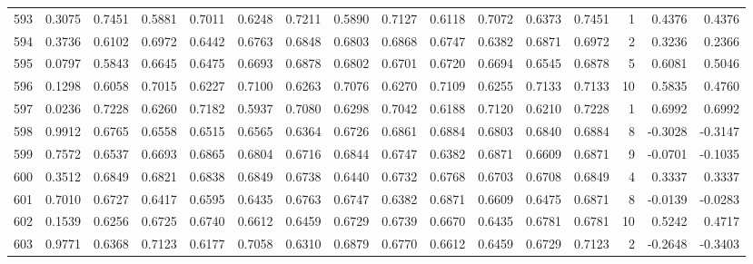 \begin{tabular}{lrrrrrrrrrrrrrrr}
593 &      0.3075 &  0.7451 &  0.5881 &  0.7011 &  0.6248 &  0.7211 &  0.5890 &  0.7127 &  0.6118 &  0.7072 &   0.6373 &     0.7451 &      1 &                    0.4376 &                     0.4376 \\
594 &      0.3736 &  0.6102 &  0.6972 &  0.6442 &  0.6763 &  0.6848 &  0.6803 &  0.6868 &  0.6747 &  0.6382 &   0.6871 &     0.6972 &      2 &                    0.3236 &                     0.2366 \\
595 &      0.0797 &  0.5843 &  0.6645 &  0.6475 &  0.6693 &  0.6878 &  0.6802 &  0.6701 &  0.6720 &  0.6694 &   0.6545 &     0.6878 &      5 &                    0.6081 &                     0.5046 \\
596 &      0.1298 &  0.6058 &  0.7015 &  0.6227 &  0.7100 &  0.6263 &  0.7076 &  0.6270 &  0.7109 &  0.6255 &   0.7133 &     0.7133 &     10 &                    0.5835 &                     0.4760 \\
597 &      0.0236 &  0.7228 &  0.6260 &  0.7182 &  0.5937 &  0.7080 &  0.6298 &  0.7042 &  0.6188 &  0.7120 &   0.6210 &     0.7228 &      1 &                    0.6992 &                     0.6992 \\
598 &      0.9912 &  0.6765 &  0.6558 &  0.6515 &  0.6565 &  0.6364 &  0.6726 &  0.6861 &  0.6884 &  0.6803 &   0.6840 &     0.6884 &      8 &                   -0.3028 &                    -0.3147 \\
599 &      0.7572 &  0.6537 &  0.6693 &  0.6865 &  0.6804 &  0.6716 &  0.6844 &  0.6747 &  0.6382 &  0.6871 &   0.6609 &     0.6871 &      9 &                   -0.0701 &                    -0.1035 \\
600 &      0.3512 &  0.6849 &  0.6821 &  0.6838 &  0.6849 &  0.6738 &  0.6440 &  0.6732 &  0.6768 &  0.6703 &   0.6708 &     0.6849 &      4 &                    0.3337 &                     0.3337 \\
601 &      0.7010 &  0.6727 &  0.6417 &  0.6595 &  0.6435 &  0.6763 &  0.6747 &  0.6382 &  0.6871 &  0.6609 &   0.6475 &     0.6871 &      8 &                   -0.0139 &                    -0.0283 \\
602 &      0.1539 &  0.6256 &  0.6725 &  0.6740 &  0.6612 &  0.6459 &  0.6729 &  0.6739 &  0.6670 &  0.6435 &   0.6781 &     0.6781 &     10 &                    0.5242 &                     0.4717 \\
603 &      0.9771 &  0.6368 &  0.7123 &  0.6177 &  0.7058 &  0.6310 &  0.6879 &  0.6770 &  0.6612 &  0.6459 &   0.6729 &     0.7123 &      2 &                   -0.2648 &                    -0.3403 \\

\end{tabular}
